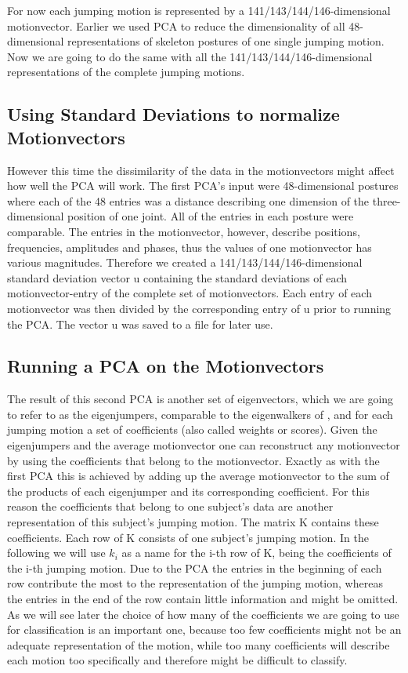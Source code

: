 \documentclass[a4paper]{article}
\begin{document}
For now each jumping motion is represented by a 141/143/144/146-dimensional motionvector.
Earlier we used PCA to reduce the dimensionality of all 48-dimensional representations of skeleton postures of one single jumping motion.
Now we are going to do the same with all the 141/143/144/146-dimensional representations of the complete jumping motions.

\subsection{Using Standard Deviations to normalize Motionvectors}

However this time the dissimilarity of the data in the motionvectors might affect how well the PCA will work.
The first PCA's input were 48-dimensional postures where each of the 48 entries was a distance describing one dimension of the three-dimensional position of one joint.
All of the entries in each posture were comparable.
The entries in the motionvector, however, describe positions, frequencies, amplitudes and phases, thus the values of one motionvector has various magnitudes.
Therefore we created a 141/143/144/146-dimensional standard deviation vector u containing the standard deviations of each motionvector-entry of the complete set of motionvectors.
Each entry of each motionvector was then divided by the corresponding entry of u prior to running the PCA.
The vector u was saved to a file for later use.

\subsection{Running a PCA on the Motionvectors}

The result of this second PCA is another set of eigenvectors, which we are going to refer to as the eigenjumpers, comparable to the eigenwalkers of \cite{origin}, and for each jumping motion a set of coefficients (also called weights or scores).
Given the eigenjumpers and the average motionvector one can reconstruct any motionvector by using the coefficients that belong to the motionvector. Exactly as with the first PCA this is achieved by adding up the average motionvector to the sum of the products of each eigenjumper and its corresponding coefficient.
For this reason the coefficients that belong to one subject's data are another representation of this subject's jumping motion.
The matrix K contains these coefficients. Each row of K consists of one subject's jumping motion. In the following we will use $k_{i}$ as a name for the i-th row of K, being the coefficients of the i-th jumping motion.
Due to the PCA the entries in the beginning of each row contribute the most to the representation of the jumping motion, whereas the entries in the end of the row contain little information and might be omitted.
As we will see later the choice of how many of the coefficients we are going to use for classification is an important one, because too few coefficients might not be an adequate representation of the motion, while too many coefficients will describe each motion too specifically and therefore might be difficult to classify.
\end{document}
